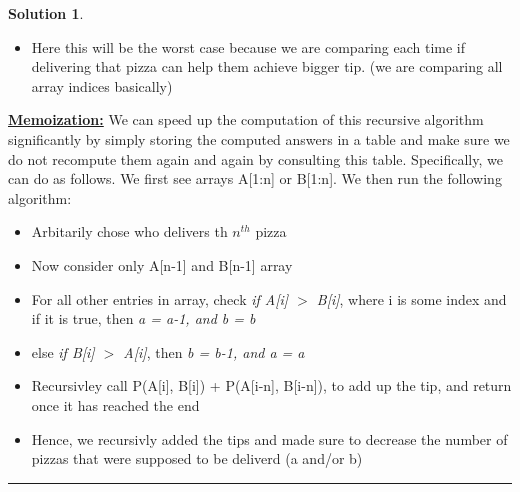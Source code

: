 \documentclass{article}
\theoremstyle{definition}
\def\fline{\rule{0.75\linewidth}{0.5pt}}
\newcommand{\finishline}{\vspace{-15pt}\begin{center}\fline\end{center}}
\newtheorem*{solution*}{Solution}
\newenvironment{solution}{\begin{solution*}}{{\finishline} \end{solution*}}
\begin{document}
\begin{solution}
\begin{itemize}
		\item Here this will be the worst case because we are comparing each time if delivering that pizza can help them achieve bigger tip. (we are comparing all array indices basically)
	\end{itemize}
	\textbf{\underline{Memoization:}} We can speed up the computation of this recursive algorithm significantly by simply storing the computed answers in a table and make sure we do not recompute them again and again by consulting this table. Specifically, we can do as follows. We first see arrays A[1:n]  or B[1:n]. We then run the following algorithm:
	\begin{itemize}
		\item Arbitarily chose who delivers th $n^{th}$ pizza
		\item Now consider only A[n-1] and B[n-1] array
		\item For all other entries in array, check {\textit{if A[i] $>$ B[i]}}, where i is some index and if it is true, then {\textit{a = a-1, and b = b}}
		\item else {\textit{if B[i] $>$ A[i]}}, then {\textit{b = b-1, and a = a}}
		\item Recursivley call P(A[i], B[i]) + P(A[i-n], B[i-n]), to add up the tip, and return once it has reached the end
		\item Hence, we recursivly added the tips and made sure to decrease the number of pizzas that were supposed to be deliverd (a and/or b)
	\end{itemize}
\end{solution}

\smallskip
\end{document}
